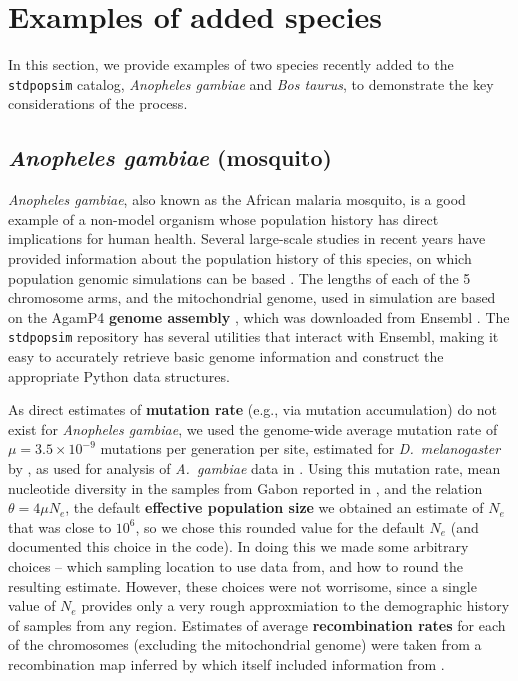 \documentclass[hidelinks]{article}
\makeatletter
\newcommand{\stdpopsim}{\texttt{stdpopsim}\xspace}
\newcommand{\labelname}[1]{\def\@currentlabelname{#1}}
\makeatother
\begin{document}
\section*{Examples of added species}
    \labelname{Examples}
    \label{sec:examples}

In this section, we provide examples of two species recently added to the \stdpopsim catalog,
\textit{Anopheles gambiae} and \textit{Bos taurus},
to demonstrate the key considerations of the process.

\subsection*{\texorpdfstring{\emph{Anopheles gambiae} (mosquito)}{Anopheles gambiae (mosquito)}}
    \label{AnoGam}

\emph{Anopheles gambiae}, also known as the African malaria mosquito, is a good example
of a non-model organism whose population history has direct implications for human health.
Several large-scale studies in recent years have provided information about the
population history of this species, on which population genomic simulations can be based \citep[e.g.,][]{Miles2017, clarkson2020genome}.
The lengths of each of the 5 chromosome arms, and the mitochondrial genome,
used in simulation are based on the AgamP4 \textbf{genome assembly} \citep{Sharakhova2007}, which 
was downloaded from Ensembl \citep{ensembl2021}.
The \stdpopsim repository has several utilities that interact with Ensembl,
making it easy to accurately retrieve basic genome information and construct the appropriate Python data structures.

As direct estimates of \textbf{mutation rate} (e.g., via mutation accumulation) do not exist for \emph{Anopheles gambiae},
we used the genome-wide average mutation rate of $\mu=3.5 \times 10^{-9}$ mutations per generation per site,
estimated for \textit{D.~melanogaster} by \cite{Keightley2009},
as used for analysis of \textit{A.~gambiae} data in \citet{Miles2017}.
Using this mutation rate, mean nucleotide diversity in the samples from Gabon reported in \citet{Miles2017},
and the relation $\theta=4\mu N_e$, the default \textbf{effective population size}
we obtained an estimate of $N_e$ that was close to $10^6$,
so we chose this rounded value for the default $N_e$ (and documented this choice in the code).
In doing this we made some arbitrary choices
-- which sampling location to use data from, and how to round the resulting estimate.
However, these choices were not worrisome,
since a single value of $N_e$ provides only a very rough approxmiation to the demographic history
of samples from any region.
Estimates of average \textbf{recombination rates} for each of the chromosomes (excluding the mitochondrial genome)
were taken from a recombination map inferred by \citet{Pombi2006} which itself included information from
\citet{zheng1996integrated}.
\end{document}
